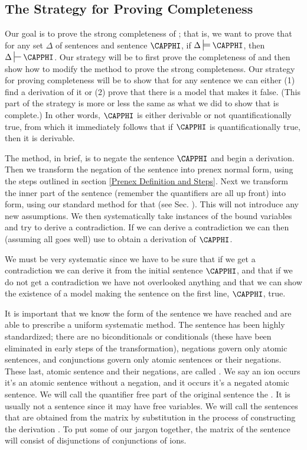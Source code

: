 \subsection{The Strategy for Proving \GQD{} Completeness}
Our goal is to prove the strong completeness of \GQD{}; 
that is, we want to prove that for any set $\Delta$ of \GQL{} sentences and \GQL{} sentence $\CAPPHI$, if $\Delta\sdtstile{}{}\CAPPHI$, then $\Delta\sststile{}{}\CAPPHI$. 
Our strategy will be to first prove the completeness of \GQD{} and then show how to modify the method to prove the strong completeness.
Our strategy for proving  completeness will be to show that for any sentence we can either (1) find a derivation of it or (2) prove that there is a model that makes it false. 
(This part of the strategy is more or less the same as what we did to show that \GSD{} is  complete.)
In other words, $\CAPPHI$ is either derivable or not quantificationally true, from which it immediately follows that if $\CAPPHI$ is quantificationally true, then it is derivable. 

The method, in brief, is to negate the sentence $\CAPPHI$ and begin a derivation.
Then we transform the negation of the sentence into prenex normal form, using the steps outlined in section \ref{Prenex Definition and Steps}. 
Next we transform the inner part of the sentence (remember the quantifiers are all up front) into  form, using our standard method for that (see Sec. ).
This will not introduce any new assumptions. 
We then systematically take instances of the bound variables and try to derive a contradiction.
If we can derive a contradiction we can then (assuming all goes well) use  to obtain a derivation of $\CAPPHI$.

We must be very systematic since we have to be sure that if we get a contradiction we can derive it from the initial sentence $\CAPPHI$, and that if we do not get a contradiction we have not overlooked anything and that we can show the existence of a model making the sentence on the first line, $\CAPPHI$, true. 

It is important that we know the form of the sentence we have reached and are able to prescribe a uniform systematic method.
The sentence has been highly standardized; 
there are no biconditionals or conditionals (these have been eliminated in early steps of the transformation), negations govern only atomic sentences, and conjunctions govern only atomic sentences or their negations. 
These last, atomic sentence and their negations, are called . 
We say an ion occurs  \Iff it's an atomic sentence without a negation, and it occurs  \Iff it's a negated atomic sentence. 
We will call the quantifier free part of the original sentence the . 
It is usually not a sentence since it may have free variables.
We will call the sentences that are obtained from the matrix by substitution in the process of constructing the derivation . 
To put some of our jargon together, the matrix of the sentence will consist of disjunctions of conjunctions of ions. 

